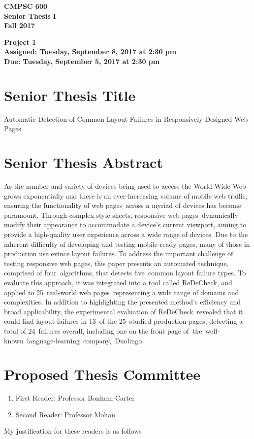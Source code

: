 \documentclass[11pt]{article}
\newcommand{\assignmentduedate}{September 5}
\newcommand{\assignmentassignedate}{September 8}
\newcommand{\labyear}{2017}
\newcommand{\labday}{Tuesday}
\newcommand{\labtime}{2:30 pm}
\newcommand{\assigneddate}{Assigned: \labday, \assignmentassignedate, \labyear{} at \labtime{}}
\newcommand{\duedate}{Due: \labday, \assignmentduedate, \labyear{} at \labtime{}}
\newcommand{\projecttitle}[1]
{
  \begin{center}
    \begin{center}
      \bf
      CMPSC 600\\Senior Thesis I\\
      Fall 2017\\
      \medskip
    \end{center}
    \bf
    #1
  \end{center}
}
\newcommand{\webpages}{web pages\xspace}
\newcommand{\stylesheets}{style sheets\xspace}
\newcommand{\numtypes}{five\xspace}
\newcommand{\numalgorithms}{four\xspace}
\newcommand{\numsubjects}{25\xspace}
\newcommand{\totalfailures}{24\xspace}
\newcommand{\numpageswithfailures}{13\xspace}
\newcommand{\redecheck}{{\sc ReDeCheck}\xspace}
\begin{document}
\thispagestyle{empty}

\projecttitle{Project 1 \\ \assigneddate{} \\ \duedate{}}

\section*{Senior Thesis Title}

\noindent
Automatic Detection of Common Layout Failures in Responsively Designed Web Pages

\section*{Senior Thesis Abstract}

As the number and variety of devices being used to access the World Wide Web grows exponentially and there is an
ever-increasing volume of mobile web traffic, ensuring the functionality of \webpages~across a myriad of devices has
become paramount. Through complex \stylesheets, responsive \webpages~dynamically modify their appearance to
accommodate a device's current viewport, aiming to provide a high-quality user experience across a wide range of
devices. Due to the inherent difficulty of developing and testing mobile-ready pages, many of those in production use
evince layout failures. To address the important challenge of testing responsive \webpages, this paper presents an
automated technique, comprised of \numalgorithms~algorithms, that detects \numtypes~common layout failure types. To
evaluate this approach, it was integrated into a tool called \mbox{\redecheck}, and applied to \numsubjects~real-world
\webpages~representing a wide range of domains and complexities. In addition to highlighting the presented method's
efficiency and broad applicability, the experimental evaluation of \redecheck~revealed that it could find layout
failures in \numpageswithfailures~of the \numsubjects~studied production pages, detecting a total of
\totalfailures~failures overall, including one on the front page of~\mbox{the well-known language-learning company,
Duolingo}.

\section*{Proposed Thesis Committee}

\begin{enumerate}
  \item First Reader: Professor Bonham-Carter
  \item Second Reader: Professor Mohan
\end{enumerate}

\noindent
My justification for these readers is as follows
\end{document}
